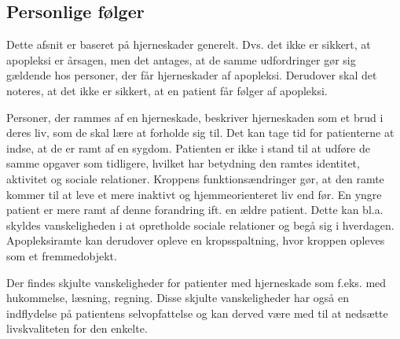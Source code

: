 \subsection{Personlige følger}
Dette afsnit er baseret på hjerneskader generelt. Dvs. det ikke er sikkert, at apopleksi er årsagen, men det antages, at de samme udfordringer gør sig gældende hos personer, der får hjerneskader af apopleksi. Derudover skal det noteres, at det ikke er sikkert, at en patient får følger af apopleksi.

Personer, der rammes af en hjerneskade, beskriver hjerneskaden som et brud i deres liv, som de skal lære at forholde sig til. Det kan tage tid for patienterne at indse, at de er ramt af en sygdom. Patienten er ikke i stand til at udføre de samme opgaver som tidligere, hvilket har betydning den ramtes identitet, aktivitet og sociale relationer. Kroppens funktionsændringer gør, at den ramte kommer til at leve et mere inaktivt og hjemmeorienteret liv end før. En yngre patient er mere ramt af denne forandring ift. en ældre patient. Dette kan bl.a. skyldes vanskeligheden i at opretholde sociale relationer og begå sig i hverdagen. Apopleksiramte kan derudover opleve en kropsspaltning, hvor kroppen opleves som et fremmedobjekt. \cite{Sundhedsstyrelsen2010,Badke2009}

Der findes skjulte vanskeligheder for patienter med hjerneskade som f.eks. med hukommelse, læsning, regning. Disse skjulte vanskeligheder har også en indflydelse på patientens selvopfattelse og  kan derved være med til at nedsætte livskvaliteten for den enkelte. \cite{Sundhedsstyrelsen2010} 




